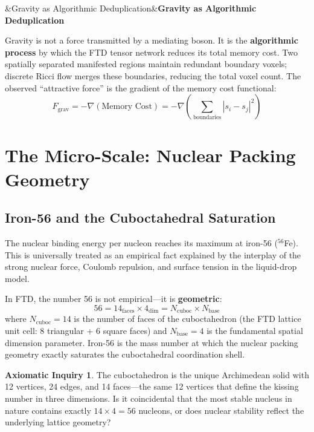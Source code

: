 \documentclass[11pt, letterpaper]{article}
\theoremstyle{definition}
\newtheorem{inquiry}{Axiomatic Inquiry}[section]
\theoremstyle{remark}
\newenvironment{axiomatic}[1][]{%
  \begin{mdframed}[
    linewidth=1.5pt,
    linecolor=black,
    backgroundcolor=gray!8,
    roundcorner=4pt,
    innertopmargin=10pt,
    innerbottommargin=10pt,
    innerleftmargin=12pt,
    innerrightmargin=12pt,
  ]%
  \ifx&#1&\else\noindent\textsf{\textbf{#1}}\par\vspace{6pt}\fi
}{%
  \end{mdframed}%
}
\begin{document}
\begin{axiomatic}[Gravity as Algorithmic Deduplication]
Gravity is not a force transmitted by a mediating boson. It is the \textbf{algorithmic process} by which the FTD tensor network reduces its total memory cost. Two spatially separated manifested regions maintain redundant boundary voxels; discrete Ricci flow merges these boundaries, reducing the total voxel count. The observed ``attractive force'' is the gradient of the memory cost functional:
\begin{equation}
    F_{\text{grav}} = -\nabla\!\left(\text{Memory Cost}\right) = -\nabla\!\left(\sum_{\text{boundaries}} |s_i - s_j|^2\right)
\end{equation}
\end{axiomatic}

\section{The Micro-Scale: Nuclear Packing Geometry}

\subsection{Iron-56 and the Cuboctahedral Saturation}

The nuclear binding energy per nucleon reaches its maximum at iron-56 ($^{56}$Fe). This is universally treated as an empirical fact explained by the interplay of the strong nuclear force, Coulomb repulsion, and surface tension in the liquid-drop model.

In FTD, the number 56 is not empirical---it is \textbf{geometric}:
\begin{equation}
    56 = 14_{\text{faces}} \times 4_{\text{dim}} = N_{\text{cuboc}} \times N_{\text{base}}
\end{equation}
where $N_{\text{cuboc}} = 14$ is the number of faces of the cuboctahedron (the FTD lattice unit cell: 8 triangular + 6 square faces) and $N_{\text{base}} = 4$ is the fundamental spatial dimension parameter. Iron-56 is the mass number at which the nuclear packing geometry exactly saturates the cuboctahedral coordination shell.

\begin{inquiry}
The cuboctahedron is the unique Archimedean solid with 12 vertices, 24 edges, and 14 faces---the same 12 vertices that define the kissing number in three dimensions. Is it coincidental that the most stable nucleus in nature contains exactly $14 \times 4 = 56$ nucleons, or does nuclear stability reflect the underlying lattice geometry?
\end{inquiry}
\end{document}
